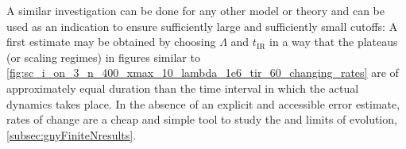 A similar investigation can be done for any other model or theory and can be used as an indication to ensure sufficiently large \uv{} and sufficiently small \ir{} cutoffs: A first estimate may be obtained by choosing $\Lambda$ and $t_\mathrm{IR}$ in a way that the plateaus (or scaling regimes) in figures similar to \cref{fig:sc_i_on_3_n_400_xmax_10_lambda_1e6_tir_60_changing_rates} are of approximately equal \rgtime{} duration than the time interval in which the actual dynamics takes place. 
In the absence of an explicit and accessible error estimate, rates of change are a cheap and simple tool to study the \uv{} and \ir{} limits of \rgtime{} evolution, \cf{} \cref{subsec:gnyFiniteNresults}.